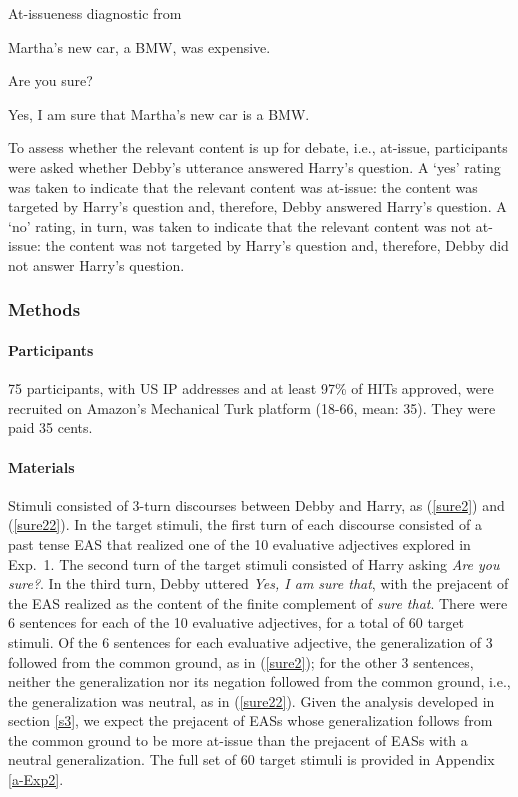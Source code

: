 \documentclass[11pt,fleqn]{article}
\newcommand{\6}{\mbox{$[\hspace*{-.6mm}[$}}
\newcommand{\9}{\mbox{$]\hspace*{-.6mm}]$}}
\begin{document}
\begin{exe}
\ex\label{sure} At-issueness diagnostic from \citealt{tbd-variability}
\begin{xlist}
 Martha's new car, a BMW, was expensive.

 Are you sure?

 Yes, I am sure that Martha's new car is a BMW. 
\end{xlist}
\end{exe}

To assess whether the relevant content is up for debate, i.e., at-issue, participants were asked whether Debby's utterance answered Harry's question. A `yes' rating was taken to indicate that the relevant content was at-issue: the content was targeted by Harry's question and, therefore, Debby answered Harry's question. A `no' rating, in turn, was taken to indicate that the relevant content was not at-issue: the content was not targeted by Harry's question and, therefore, Debby did not answer Harry's question.

\subsubsection{Methods}

\paragraph{Participants} 75 participants, with US IP addresses and at least 97\% of HITs approved, were recruited on Amazon's Mechanical Turk platform (18-66, mean: 35). They were paid 35 cents.

\paragraph{Materials} Stimuli consisted of 3-turn discourses between Debby and Harry, as (\ref{sure2}) and (\ref{sure22}). In the target stimuli, the first turn of each discourse consisted of a past tense EAS that realized one of the 10 evaluative adjectives explored in Exp.~1. The second turn of the target stimuli consisted of Harry asking {\em Are you sure?}. In the third turn, Debby uttered {\em Yes, I am sure that}, with the prejacent of the EAS realized as the content of the finite complement of {\em sure that}. There were 6 sentences for each of the 10 evaluative adjectives, for a total of 60 target stimuli. Of the 6 sentences for each evaluative adjective, the generalization of 3 followed from the common ground, as in (\ref{sure2}); for the other 3 sentences, neither the generalization nor its negation followed from the common ground, i.e., the generalization was neutral, as in (\ref{sure22}). Given the analysis developed in section \ref{s3}, we expect the prejacent of EASs whose generalization follows from the common ground to be more at-issue than the prejacent of EASs with a neutral generalization. The full set of 60 target stimuli is provided in Appendix \ref{a-Exp2}.
\end{document}
